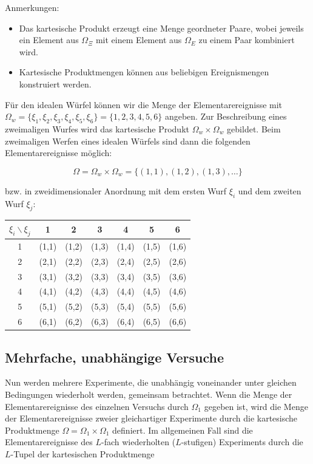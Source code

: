 Anmerkungen:

\begin{itemize}
  \item Das kartesische Produkt erzeugt eine Menge geordneter Paare, wobei jeweils ein Element aus $\Omega_\Xi$ mit einem Element aus $\Omega_E$ zu einem Paar kombiniert wird.
  \item Kartesische Produktmengen können aus beliebigen Ereignismengen konstruiert werden.
\end{itemize}

\begin{beispiel}
Für den idealen Würfel können wir die Menge der Elementarereignisse mit $\Omega_w = \{\xi_1, \xi_2, \xi_3, \xi_4, \xi_5, \xi_6\} = \{1,2,3,4,5,6\}$ angeben. Zur Beschreibung eines zweimaligen Wurfes wird das kartesische Produkt $\Omega_w \times \Omega_w$ gebildet. Beim zweimaligen Werfen eines idealen Würfels sind dann die folgenden Elementarereignisse möglich:

$$
\Omega = \Omega_w \times \Omega_w = \{(1,1),(1,2),(1,3),\ldots\}
$$

bzw. in zweidimensionaler Anordnung mit dem ersten Wurf $\xi_i$ und dem zweiten Wurf $\xi_j$:

\begin{center}
\begin{tabular}{c|cccccc}
  $\xi_i \backslash \xi_j$ & 1 & 2 & 3 & 4 & 5 & 6 \\
  \hline
  1 & (1,1) & (1,2) & (1,3) & (1,4) & (1,5) & (1,6) \\
  2 & (2,1) & (2,2) & (2,3) & (2,4) & (2,5) & (2,6) \\
  3 & (3,1) & (3,2) & (3,3) & (3,4) & (3,5) & (3,6) \\
  4 & (4,1) & (4,2) & (4,3) & (4,4) & (4,5) & (4,6) \\
  5 & (5,1) & (5,2) & (5,3) & (5,4) & (5,5) & (5,6) \\
  6 & (6,1) & (6,2) & (6,3) & (6,4) & (6,5) & (6,6) \\
\end{tabular}
\end{center}
\end{beispiel}

\subsection{Mehrfache, unabhängige Versuche}
\label{sec:unabhaengige-versuche}

Nun werden mehrere Experimente, die unabhängig voneinander unter gleichen Bedingungen wiederholt werden, gemeinsam betrachtet. Wenn die Menge der Elementarereignisse des einzelnen Versuchs durch $\Omega_1$ gegeben ist, wird die Menge der Elementarereignisse zweier gleichartiger Experimente durch die kartesische Produktmenge $\Omega = \Omega_1 \times \Omega_1$ definiert. Im allgemeinen Fall sind die Elementarereignisse des $L$-fach wiederholten ($L$-stufigen) Experiments durch die $L$-Tupel der kartesischen Produktmenge

